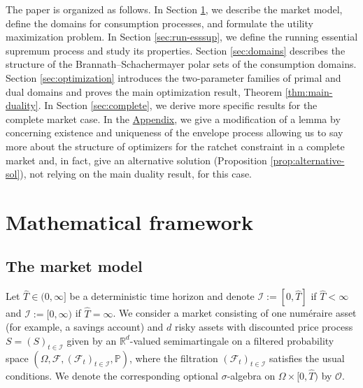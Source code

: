 \documentclass[11pt, oneside]{article}   	%
\theoremstyle{plain}
\theoremstyle{definition}
\theoremstyle{remark}
\begin{document}
The paper is organized as follows. In Section \ref{sec:math-framework}, we describe the market model, define the domains for consumption processes, and formulate the utility maximization problem. In Section \ref{sec:run-esssup}, we define the running essential supremum process and study its properties. Section \ref{sec:domains} describes the structure of the Brannath--Schachermayer polar sets of the consumption domains. Section \ref{sec:optimization} introduces the two-parameter families of primal and dual domains and proves the main optimization result, Theorem \ref{thm:main-duality}. In Section \ref{sec:complete}, we derive more specific results for the complete market case. In the \hyperref[app:envelope]{Appendix}, we give a modification of a lemma by \cite{BK} concerning existence and uniqueness of the envelope process allowing us to say more about the structure of optimizers for the ratchet constraint in a complete market and, in fact, give an alternative solution (Proposition \ref{prop:alternative-sol}), not relying on the main duality result, for this case.

\section{Mathematical framework}\label{sec:math-framework}


\subsection{The market model}

Let $\hat{T}\in(0,\infty]$ be a deterministic time horizon and denote $\mathcal{I}:=[0,\hat{T}]$ if $\hat{T}<\infty$ and $\mathcal{I}:=[0,\infty)$ if $\hat{T}=\infty$. We consider a market consisting of one num\'eraire asset (for example, a savings account) and $d$ risky assets with discounted price process $S=(S)_{t\in\mathcal{I}}$ given by an $\mathbb{R}^d$-valued semimartingale on a filtered probability space $(\Omega,\mathcal{F},(\mathcal{F}_t)_{t\in\mathcal{I}},\mathbb{P})$, where the filtration $(\mathcal{F}_t)_{t\in\mathcal{I}}$ satisfies the usual conditions. We denote the corresponding optional $\sigma$-algebra on $\Omega\times[0,\hat{T})$ by $\mathcal{O}$.
\end{document}
